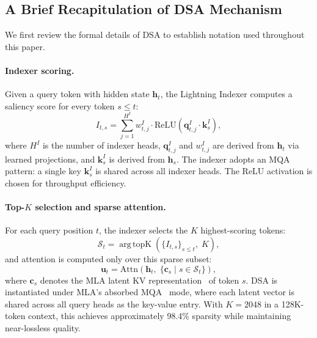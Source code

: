 \documentclass{article}
\begin{document}
\subsection{A Brief Recapitulation of DSA Mechanism}
\label{sec:dsa_recap}

We first review the formal details of DSA to establish notation used throughout this paper.

\paragraph{Indexer scoring.}
Given a query token with hidden state $\mathbf{h}_t$, the Lightning Indexer computes a saliency score for every token $s \leq t$:
\begin{equation}
\label{eq:indexer_score}
I_{t,s} = \sum_{j=1}^{H^I} w_{t,j}^I \cdot \mathrm{ReLU}\!\left(\mathbf{q}_{t,j}^I \cdot \mathbf{k}_s^I\right),
\end{equation}
where $H^I$ is the number of indexer heads, $\mathbf{q}_{t,j}^I$ and $w_{t,j}^I$ are derived from $\mathbf{h}_t$ via learned projections, and $\mathbf{k}_s^I$ is derived from $\mathbf{h}_s$. The indexer adopts an MQA~\citep{shazeer2019mqa} pattern: a single key $\mathbf{k}_s^I$ is shared across all indexer heads. The ReLU activation is chosen for throughput efficiency.

\paragraph{Top-$K$ selection and sparse attention.}
For each query position $t$, the indexer selects the $K$ highest-scoring tokens:
\begin{equation}
\label{eq:topk}
\mathcal{S}_t = \mathop{\mathrm{arg\,topK}} (\{I_{t,s}\}_{s \leq t}, \; K),
\end{equation}
and attention is computed only over this sparse subset:
\begin{equation}
\label{eq:sparse_attn}
\mathbf{u}_t = \mathrm{Attn}\!\left(\mathbf{h}_t,\; \{\mathbf{c}_s \mid s \in \mathcal{S}_t\}\right),
\end{equation}
where $\mathbf{c}_s$ denotes the MLA latent KV representation~\citep{liu2024deepseekv2} of token $s$. DSA is instantiated under MLA's absorbed MQA~\citep{shazeer2019mqa} mode, where each latent vector is shared across all query heads as the key-value entry. With $K = 2048$ in a 128K-token context, this achieves approximately 98.4\% sparsity while maintaining near-lossless quality.
\end{document}
